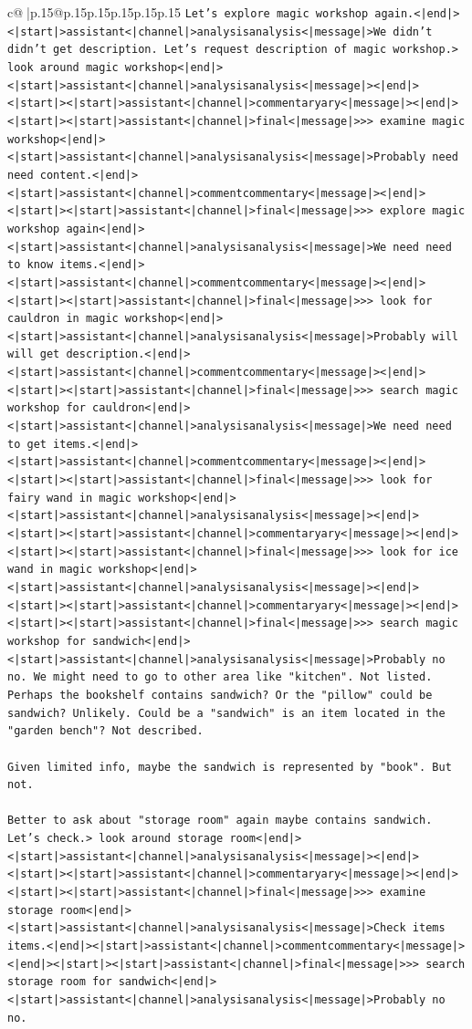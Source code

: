 \documentclass{article}
\begin{document}
{\begin{supertabular}{c@{$\;$}|p{.15\linewidth}@{}p{.15\linewidth}p{.15\linewidth}p{.15\linewidth}p{.15\linewidth}p{.15\linewidth}}
{{{\texttt{Let's explore magic workshop again.<|end|><|start|>assistant<|channel|>analysisanalysis<|message|>We didn't didn't get description. Let's request description of magic workshop.> look around magic workshop<|end|><|start|>assistant<|channel|>analysisanalysis<|message|><|end|><|start|><|start|>assistant<|channel|>commentaryary<|message|><|end|><|start|><|start|>assistant<|channel|>final<|message|>>> examine magic workshop<|end|><|start|>assistant<|channel|>analysisanalysis<|message|>Probably need need content.<|end|><|start|>assistant<|channel|>commentcommentary<|message|><|end|><|start|><|start|>assistant<|channel|>final<|message|>>> explore magic workshop again<|end|><|start|>assistant<|channel|>analysisanalysis<|message|>We need need to know items.<|end|><|start|>assistant<|channel|>commentcommentary<|message|><|end|><|start|><|start|>assistant<|channel|>final<|message|>>> look for cauldron in magic workshop<|end|><|start|>assistant<|channel|>analysisanalysis<|message|>Probably will will get description.<|end|><|start|>assistant<|channel|>commentcommentary<|message|><|end|><|start|><|start|>assistant<|channel|>final<|message|>>> search magic workshop for cauldron<|end|><|start|>assistant<|channel|>analysisanalysis<|message|>We need need to get items.<|end|><|start|>assistant<|channel|>commentcommentary<|message|><|end|><|start|><|start|>assistant<|channel|>final<|message|>>> look for fairy wand in magic workshop<|end|><|start|>assistant<|channel|>analysisanalysis<|message|><|end|><|start|><|start|>assistant<|channel|>commentaryary<|message|><|end|><|start|><|start|>assistant<|channel|>final<|message|>>> look for ice wand in magic workshop<|end|><|start|>assistant<|channel|>analysisanalysis<|message|><|end|><|start|><|start|>assistant<|channel|>commentaryary<|message|><|end|><|start|><|start|>assistant<|channel|>final<|message|>>> search magic workshop for sandwich<|end|><|start|>assistant<|channel|>analysisanalysis<|message|>Probably no no. We might need to go to other area like "kitchen". Not listed. Perhaps the bookshelf contains sandwich? Or the "pillow" could be sandwich? Unlikely. Could be a "sandwich" is an item located in the "garden bench"? Not described.} \\
\\ 
\texttt{Given limited info, maybe the sandwich is represented by "book". But not.} \\
\\ 
\texttt{Better to ask about "storage room" again maybe contains sandwich. Let's check.> look around storage room<|end|><|start|>assistant<|channel|>analysisanalysis<|message|><|end|><|start|><|start|>assistant<|channel|>commentaryary<|message|><|end|><|start|><|start|>assistant<|channel|>final<|message|>>> examine storage room<|end|><|start|>assistant<|channel|>analysisanalysis<|message|>Check items items.<|end|><|start|>assistant<|channel|>commentcommentary<|message|><|end|><|start|><|start|>assistant<|channel|>final<|message|>>> search storage room for sandwich<|end|><|start|>assistant<|channel|>analysisanalysis<|message|>Probably no no.} \\
}}}
\end{supertabular}}
\end{document}
